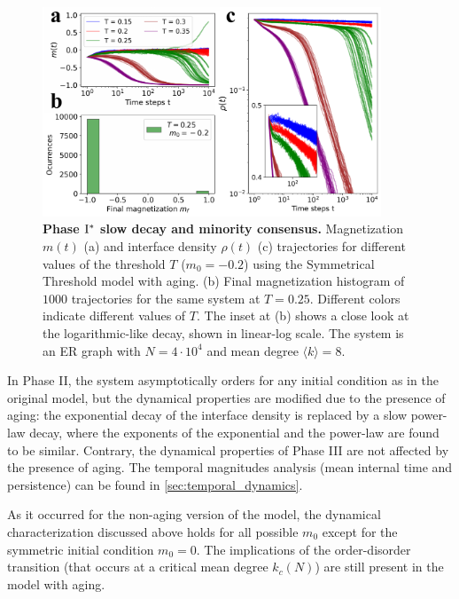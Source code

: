 	\begin{figure}
		\centering
		\includegraphics[width=0.9\textwidth]{Figs/Aging_STM/FIG7.pdf}
		\caption{\label{fig:mixed_phase} \textbf{Phase ${\rm I}^{*}$ slow decay and minority consensus.} Magnetization $m(t)$ (a) and interface density $\rho(t)$ (c) trajectories for different values of the threshold $T$ ($m_0 = -0.2$) using the Symmetrical Threshold model with aging. (b) Final magnetization histogram of $1000$ trajectories for the same system at $T=0.25$. Different colors indicate different values of $T$. The inset at (b) shows a close look at the logarithmic-like decay, shown in linear-log scale. The system is an ER graph with $N = 4 \cdot 10^4$ and mean degree $\langle k \rangle = 8$.}
	\end{figure}
	In Phase II, the system asymptotically orders for any initial condition as in the original model, but the dynamical properties are modified due to the presence of aging: the exponential decay of the interface density is replaced by a slow power-law decay, where the exponents of the exponential and the power-law are found to be similar. Contrary, the dynamical properties of Phase III are not affected by the presence of aging. The temporal magnitudes analysis (mean internal time and persistence) can be found in \ref{sec:temporal_dynamics}. 
	
	As it occurred for the non-aging version of the model, the dynamical characterization discussed above holds for all possible
	$m_0$ except for the symmetric initial condition $m_0 = 0$. The implications of the order-disorder transition (that occurs at a critical mean degree $k_c (N)$) \cite{Konstantin} are still present in the model with aging.
	
